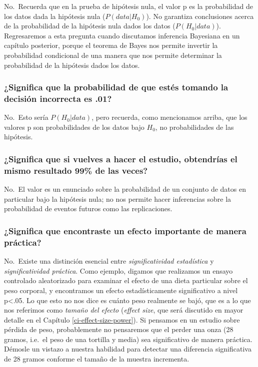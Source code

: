 \documentclass[
  12pt,
]{book}
\theoremstyle{definition}
\theoremstyle{definition}
\theoremstyle{definition}
\theoremstyle{remark}
\begin{document}
No.~Recuerda que en la prueba de hipótesis nula, el valor p es la probabilidad de los datos dada la hipótesis nula (\(P(data|H_0)\)). No garantiza conclusiones acerca de la probabilidad de la hipótesis nula dados los datos (\(P(H_0|data)\)). Regresaremos a esta pregunta cuando discutamos inferencia Bayesiana en un capítulo posterior, porque el teorema de Bayes nos permite invertir la probabilidad condicional de una manera que nos permite determinar la probabilidad de la hipótesis dados los datos.

\hypertarget{significa-que-la-probabilidad-de-que-estuxe9s-tomando-la-decisiuxf3n-incorrecta-es-.01}{%
\subsubsection{¿Significa que la probabilidad de que estés tomando la decisión incorrecta es .01?}\label{significa-que-la-probabilidad-de-que-estuxe9s-tomando-la-decisiuxf3n-incorrecta-es-.01}}

No.~Esto sería \(P(H_0|data)\), pero recuerda, como mencionamos arriba, que los valores p son probabilidades de los datos bajo \(H_0\), no probabilidades de las hipótesis.

\hypertarget{significa-que-si-vuelves-a-hacer-el-estudio-obtendruxedas-el-mismo-resultado-99-de-las-veces}{%
\subsubsection{¿Significa que si vuelves a hacer el estudio, obtendrías el mismo resultado 99\% de las veces?}\label{significa-que-si-vuelves-a-hacer-el-estudio-obtendruxedas-el-mismo-resultado-99-de-las-veces}}

No.~El valor es un enunciado sobre la probabilidad de un conjunto de datos en particular bajo la hipótesis nula; no nos permite hacer inferencias sobre la probabilidad de eventos futuros como las replicaciones.

\hypertarget{significa-que-encontraste-un-efecto-importante-de-manera-pruxe1ctica}{%
\subsubsection{¿Significa que encontraste un efecto importante de manera práctica?}\label{significa-que-encontraste-un-efecto-importante-de-manera-pruxe1ctica}}

No.~Existe una distinción esencial entre \emph{significatividad estadística} y \emph{significatividad práctica}. Como ejemplo, digamos que realizamos un ensayo controlado aleatorizado para examinar el efecto de una dieta particular sobre el peso corporal, y encontramos un efecto estadísticamente significativo a nivel p\textless.05. Lo que esto no nos dice es cuánto peso realmente se bajó, que es a lo que nos referimos como \emph{tamaño del efecto} (\emph{effect size}, que será discutido en mayor detalle en el Capítulo \ref{ci-effect-size-power}). Si pensamos en un estudio sobre pérdida de peso, probablemente no pensaremos que el perder una onza (28 gramos, i.e.~el peso de una tortilla y media) sea significativo de manera práctica. Démosle un vistazo a nuestra habilidad para detectar una diferencia significativa de 28 gramos conforme el tamaño de la muestra incrementa.
\end{document}

